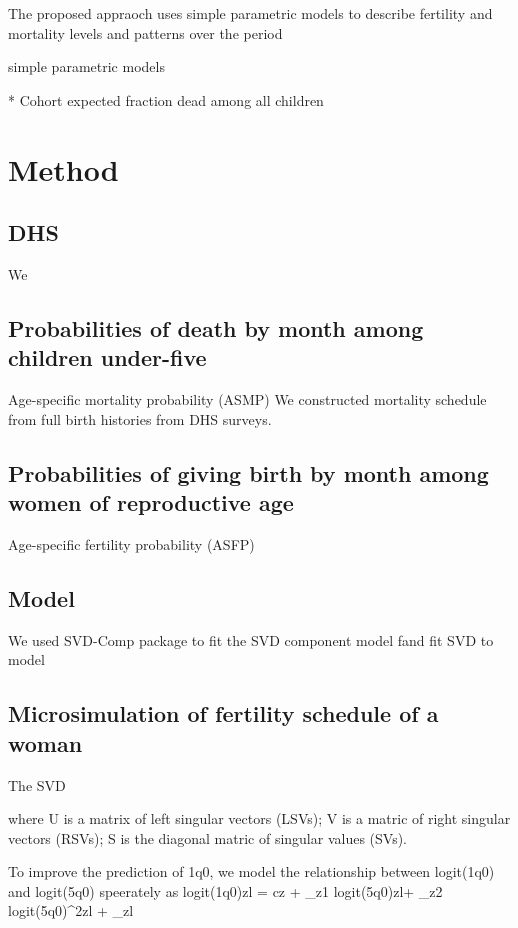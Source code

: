 \documentclass[11pt,letterpaper]{article}
\begin{document}
The proposed appraoch uses simple parametric models to describe fertility and mortality levels and patterns over the period 

simple parametric models 

* Cohort expected fraction dead among all children 

\section{Method}

\subsection*{DHS}

We 

\subsection*{Probabilities of death by month among children under-five}

Age-specific mortality probability (ASMP)
We constructed mortality schedule from full birth histories from DHS surveys.


\subsection*{Probabilities of giving birth by month among women of reproductive age}

Age-specific fertility probability (ASFP)

\subsection*{Model }

We used SVD-Comp package to fit the SVD component model fand fit  SVD to model

\subsection*{Microsimulation of fertility schedule of a woman}

The SVD 

where U is a matrix of left singular vectors (LSVs);
V is a matric of right singular vectors (RSVs); 
S is the diagonal matric of singular values (SVs). 

To improve the prediction of 1q0, we model the relationship between logit(1q0) and logit(5q0) speerately as 
logit(1q0)zl = cz + \beta_z1 logit(5q0)zl+ \beta_z2 logit(5q0)^2zl + \epsilon_zl
\end{document}
